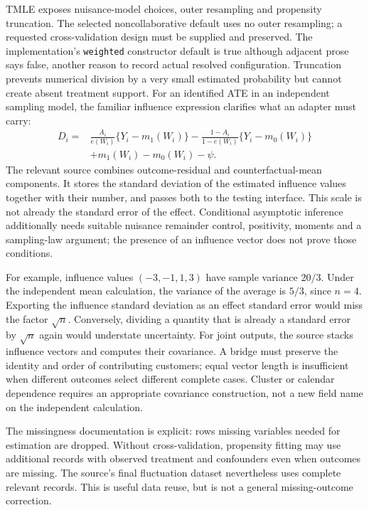 TMLE exposes nuisance-model choices, outer resampling and propensity
truncation. The selected noncollaborative default uses no outer resampling;
a requested cross-validation design must be supplied and preserved. The
implementation's \texttt{weighted} constructor default is true although
adjacent prose says false, another reason to record actual resolved
configuration. Truncation prevents numerical division by a very small
estimated probability but cannot create absent treatment support. For an
identified ATE in an independent sampling model, the familiar influence
expression clarifies what an adapter must carry:
\begin{equation}
\label{exec21:effects-influence}
\begin{aligned}
 D_i={}&\frac{A_i}{e(W_i)}\{Y_i-m_1(W_i)\}
       -\frac{1-A_i}{1-e(W_i)}\{Y_i-m_0(W_i)\}\\
       &+m_1(W_i)-m_0(W_i)-\psi .
\end{aligned}
\end{equation}
The relevant source combines outcome-residual and counterfactual-mean
components. It stores the standard deviation of the estimated influence
values together with their number, and passes both to the testing
interface. This scale is not already the standard error of the effect.
Conditional asymptotic inference additionally needs suitable nuisance
remainder control, positivity, moments and a sampling-law argument; the
presence of an influence vector does not prove those conditions.
\cite{exec21_effects_tmle}

For example, influence values $(-3,-1,1,3)$ have sample variance $20/3$.
Under the independent mean calculation, the variance of the average is
$5/3$, since $n=4$. Exporting the influence standard deviation as an effect
standard error would miss the factor $\sqrt n$. Conversely, dividing a
quantity that is already a standard error by $\sqrt n$ again would understate
uncertainty. For joint outputs, the source stacks influence vectors and
computes their covariance. A bridge must preserve the identity and order
of contributing customers; equal vector length is insufficient when
different outcomes select different complete cases. Cluster or calendar
dependence requires an appropriate covariance construction, not a new field
name on the independent calculation. \cite{exec21_effects_tmle,exec21_effects_reference}

The missingness documentation is explicit: rows missing variables needed
for estimation are dropped. Without cross-validation, propensity fitting
may use additional records with observed treatment and confounders even
when outcomes are missing. The source's final fluctuation dataset nevertheless
uses complete relevant records. This is useful data reuse, but is not a
general missing-outcome correction. \cite{exec21_effects_tmle}

